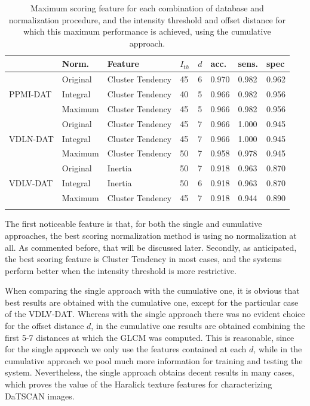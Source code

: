 \begin{table}[htp]
	\centering
\begin{tabular}{llllllll}
	\toprule
	                          & Norm.    & Feature          & $I_{th}$ & $d$ & acc.  & sens. & spec  \\ \midrule
	\multirow{3}{*}{PPMI-DAT} & Original & Cluster Tendency & 45       & 6   & 0.970 & 0.982 & 0.962 \\
	                          & Integral & Cluster Tendency & 40       & 5   & 0.966 & 0.982 & 0.956 \\
	                          & Maximum  & Cluster Tendency & 45       & 5   & 0.966 & 0.982 & 0.956 \\ \midrule
	\multirow{3}{*}{VDLN-DAT} & Original & Cluster Tendency & 45       & 7   & 0.966 & 1.000 & 0.945 \\
	                          & Integral & Cluster Tendency & 45       & 7   & 0.966 & 1.000 & 0.945 \\
	                          & Maximum  & Cluster Tendency & 50       & 7   & 0.958 & 0.978 & 0.945 \\ \midrule
	\multirow{3}{*}{VDLV-DAT} & Original & Inertia          & 50       & 7   & 0.918 & 0.963 & 0.870 \\
	                          & Integral & Inertia          & 50       & 6   & 0.918 & 0.963 & 0.870 \\
	                          & Maximum  & Cluster Tendency & 45       & 7   & 0.918 & 0.944 & 0.890 \\ \bottomrule
	                          &
\end{tabular}
	\caption[Maximum scoring feature (cumulative approach).]{Maximum scoring feature for each combination of database and normalization procedure, and the intensity threshold and offset distance for which this maximum performance is achieved, using the cumulative approach.}
	\label{tab:exp1AccCumulative}
\end{table}

The first noticeable feature is that, for both the single and cumulative approaches, the best scoring normalization method is using no normalization at all. As commented before, that will be discussed later. Secondly, as anticipated, the best scoring feature is Cluster Tendency in most cases, and the systems perform better when the intensity threshold is more restrictive. 

When comparing the single approach with the cumulative one, it is obvious that best results are obtained with the cumulative one, except for the particular case of the VDLV-DAT. Whereas with the single approach there was no evident choice for the offset distance $d$, in the cumulative one results are obtained combining the first 5-7 distances at which the \ac{GLCM} was computed. This is reasonable, since for the single approach we only use the features contained at each $d$, while in the cumulative approach we pool much more information for training and testing the system. Nevertheless, the single approach obtains decent results in many cases, which proves the value of the Haralick texture features for characterizing DaTSCAN images. 

